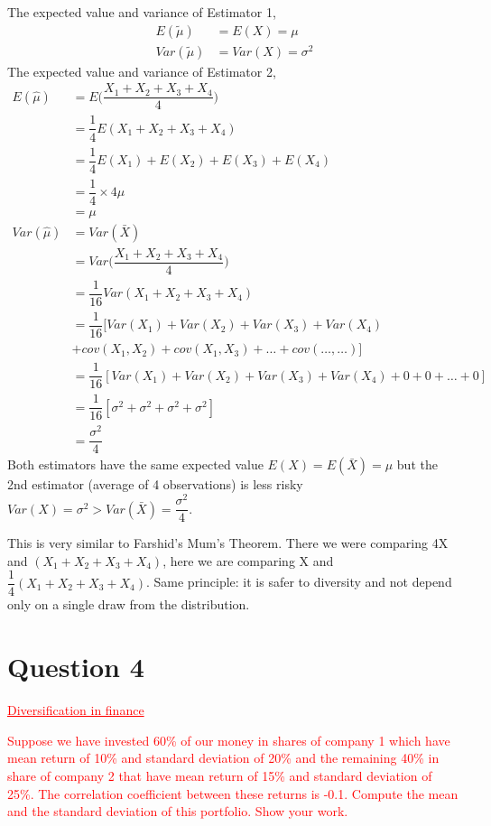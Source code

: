 \documentclass[12pt]{report}
\begin{document}
\noindent The expected value and variance of Estimator 1,
\begin{align*}
E(\tilde{\mu}) &= E(X) = \mu \\
Var(\tilde{\mu}) &= Var(X) = \sigma^2
\end{align*}
\noindent The expected value and variance of Estimator 2, 
\begin{align*}
E(\hat{\mu}) &= E\Big(\dfrac{X_1+X_2+X_3+X_4}{4}\Big) \\
&= \dfrac{1}{4}E(X_1+X_2+X_3+X_4) \\
&= \dfrac{1}{4} E(X_1)+E(X_2)+E(X_3)+E(X_4)\\
&= \dfrac{1}{4} \times 4\mu \\
&=\mu \\
Var(\hat{\mu}) &= Var(\bar{X}) \\
&= Var\Big(\dfrac{X_1+X_2+X_3+X_4}{4}\Big) \\
&=\dfrac{1}{16}Var(X_1+X_2+X_3+X_4) \\
&= \dfrac{1}{16}[Var(X_1)+Var(X_2)+Var(X_3)+Var(X_4) \\
&+cov(X_1,X_2)+cov(X_1,X_3)+\dots+cov(\dots,\dots)] \\
&= \dfrac{1}{16}[Var(X_1)+Var(X_2)+Var(X_3)+Var(X_4) + 0 + 0 + \dots + 0] \\
&= \dfrac{1}{16}[\sigma^2+\sigma^2+\sigma^2+\sigma^2] \\
&= \dfrac{\sigma^2}{4}
\end{align*}
\noindent Both estimators have the same expected value $E(X) = E(\bar{X}) = \mu$ but the 2nd estimator (average of 4 observations) is less risky $Var(X) = \sigma^2 > Var(\bar{X}) = \dfrac{\sigma^2}{4}$.

\noindent This is very similar to Farshid's Mum's Theorem. There we were comparing 4X and $(X_1+X_2+X_3+X_4)$, here we are comparing X and $\dfrac{1}{4}(X_1+X_2+X_3+X_4)$. Same principle: it is safer to diversity and not depend only on a single draw from the distribution.


\newpage
\section*{Question 4}
\textcolor{red}{\underline{Diversification in finance}}

\noindent \textcolor{red}{Suppose we have invested 60\% of our money in shares of company 1 which have mean return of 10\% and standard deviation of 20\% and the remaining 40\% in share of company 2 that have mean return of 15\% and standard deviation of 25\%. The correlation coefficient between these returns is -0.1. Compute the mean and the standard deviation of this portfolio. Show your work.}
\end{document}
